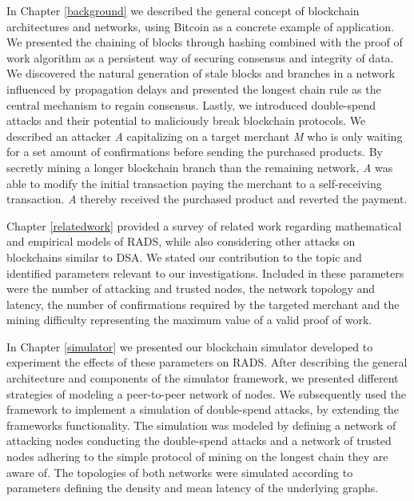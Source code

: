 \documentclass[a4paper,12pt,twoside]{report}
\begin{document}
In Chapter \ref{background} we described the general concept of blockchain architectures and networks, using Bitcoin as a concrete example of application. We presented the chaining of blocks through hashing combined with the proof of work algorithm as a persistent way of securing consensus and integrity of data. We discovered the natural generation of stale blocks and branches in a network influenced by propagation delays and presented the longest chain rule as the central mechanism to regain consensus. Lastly, we introduced double-spend attacks and their potential to maliciously break blockchain protocols. We described an attacker \textit{A} capitalizing on a target merchant \textit{M} who is only waiting for a set amount of confirmations before sending the purchased products. By secretly mining a longer blockchain branch than the remaining network, \textit{A} was able to modify the initial transaction paying the merchant to a self-receiving transaction. \textit{A} thereby received the purchased product and reverted the payment.

Chapter \ref{relatedwork} provided a survey of related work regarding mathematical and empirical models of RADS, while also considering other attacks on blockchains similar to DSA. We stated our contribution to the topic and identified parameters relevant to our investigations. Included in these parameters were the number of attacking and trusted nodes, the network topology and latency, the number of confirmations required by the targeted merchant and the mining difficulty representing the maximum value of a valid proof of work. 

In Chapter \ref{simulator} we presented our blockchain simulator developed to experiment the effects of these parameters on RADS. After describing the general architecture and components of the simulator framework, we presented different strategies of modeling a peer-to-peer network of nodes. We subsequently used the framework to implement a simulation of double-spend attacks, by extending the frameworks functionality. The simulation was modeled by defining a network of attacking nodes conducting the double-spend attacks and a network of trusted nodes adhering to the simple protocol of mining on the longest chain they are aware of. The topologies of both networks were simulated according to parameters defining the density and mean latency of the underlying graphs.
\end{document}
